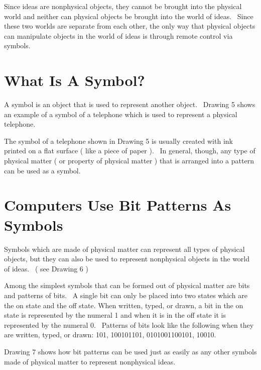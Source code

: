 \documentclass[12pt,twoside]{book}
\begin{document}
\bigskip

Since ideas are nonphysical objects, they cannot be brought into the physical world and neither can physical objects be brought into the world of ideas. \ Since these two worlds are separate from each other, the only way that physical objects can manipulate objects in the world of ideas is through remote control via symbols.

\section[What Is A Symbol?]{What Is A Symbol?}

A symbol is an object that is used to represent another object. \ Drawing 5 shows an example of a symbol of a telephone which is used to represent a physical telephone. 

\bigskip

The symbol of a telephone shown in Drawing 5 is usually created with ink printed on a flat surface ( like a piece of paper ). \ In general, though, any type of physical matter ( or property of physical matter ) that is arranged into a pattern can be used as a symbol.

\section[Computers Use Bit Patterns As Symbols]{ Computers Use Bit Patterns As Symbols}

Symbols which are made of physical matter can represent all types of physical objects, but they can also be used to represent nonphysical objects in the world of ideas. \ ( see Drawing 6 ) 

\bigskip


\bigskip

Among the simplest symbols that can be formed out of physical matter are bits and patterns of bits. \ A single bit can only be placed into two states which are the on state and the off state. When written, typed, or drawn, a bit in the on state is represented by the numeral 1 and when it is in the off state it is represented by the numeral 0. \ Patterns of bits look like the following when they are written, typed, or drawn: 101, 100101101, 0101001100101, 10010. 

\bigskip

Drawing 7 shows how bit patterns can be used just as easily as any other symbols made of physical matter to represent nonphysical ideas. 

\bigskip
\end{document}

